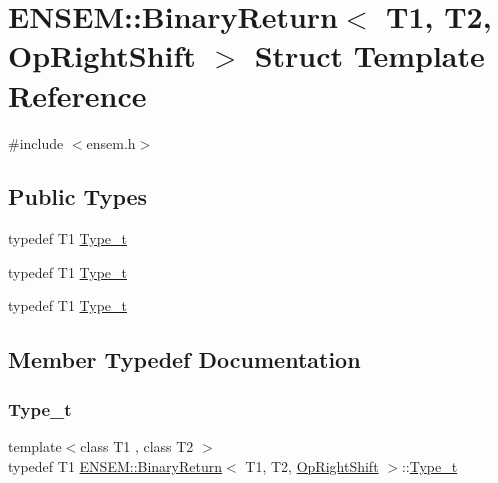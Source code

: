 \hypertarget{structENSEM_1_1BinaryReturn_3_01T1_00_01T2_00_01OpRightShift_01_4}{}\section{E\+N\+S\+EM\+:\+:Binary\+Return$<$ T1, T2, Op\+Right\+Shift $>$ Struct Template Reference}
\label{structENSEM_1_1BinaryReturn_3_01T1_00_01T2_00_01OpRightShift_01_4}


{\ttfamily \#include $<$ensem.\+h$>$}

\subsection*{Public Types}
\begin{DoxyCompactItemize}
\item 
typedef T1 \mbox{\hyperlink{structENSEM_1_1BinaryReturn_3_01T1_00_01T2_00_01OpRightShift_01_4_a5376360119f221e4df1236c273764f02}{Type\+\_\+t}}
\item 
typedef T1 \mbox{\hyperlink{structENSEM_1_1BinaryReturn_3_01T1_00_01T2_00_01OpRightShift_01_4_a5376360119f221e4df1236c273764f02}{Type\+\_\+t}}
\item 
typedef T1 \mbox{\hyperlink{structENSEM_1_1BinaryReturn_3_01T1_00_01T2_00_01OpRightShift_01_4_a5376360119f221e4df1236c273764f02}{Type\+\_\+t}}
\end{DoxyCompactItemize}


\subsection{Member Typedef Documentation}
\mbox{\label{structENSEM_1_1BinaryReturn_3_01T1_00_01T2_00_01OpRightShift_01_4_a5376360119f221e4df1236c273764f02}} 
\subsubsection{\texorpdfstring{Type\_t}{Type\_t}\hspace{0.1cm}{\footnotesize\ttfamily [1/3]}}
{\footnotesize\ttfamily template$<$class T1 , class T2 $>$ \\
typedef T1 \mbox{\hyperlink{structENSEM_1_1BinaryReturn}{E\+N\+S\+E\+M\+::\+Binary\+Return}}$<$ T1, T2, \mbox{\hyperlink{structENSEM_1_1OpRightShift}{Op\+Right\+Shift}} $>$\+::\mbox{\hyperlink{structENSEM_1_1BinaryReturn_3_01T1_00_01T2_00_01OpRightShift_01_4_a5376360119f221e4df1236c273764f02}{Type\+\_\+t}}}

